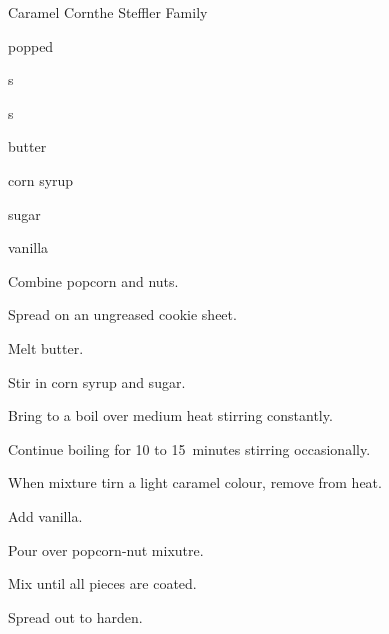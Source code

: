 \begin{recipe}{Caramel Corn}{the Steffler Family}{}

\begin{ingredients}
\item {} popped 
\item \C{\half} s
\item \C{\half} s
\item \C{\half} butter
\item \C{\quarter} corn syrup
\item \C{\twothird} sugar
\item {} vanilla
\end{ingredients}

\begin{directions}
\item Combine popcorn and nuts.
\item Spread on an ungreased cookie sheet.
\item Melt butter.
\item Stir in corn syrup and sugar.
\item Bring to a boil over medium heat stirring constantly.
\item Continue boiling for 10 to 15~minutes stirring occasionally.
\item When mixture tirn a light caramel colour, remove from heat.
\item Add vanilla.
\item Pour over popcorn-nut mixutre.
\item Mix until all pieces are coated.
\item Spread out to harden.
\end{directions}
\end{recipe}
